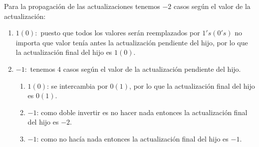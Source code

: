 \documentclass[letterpaper]{article}
\theoremstyle{definition}
\theoremstyle{lemathm}
\theoremstyle{lemathm}
\theoremstyle{lemathm}
\theoremstyle{lemademthm}
\newcommand{\1}{\mathbbm{1}}
\begin{document}
	Para la propagación de las actualizaciones tenemos $-2$ casos según el valor de la actualización:

	\begin{enumerate}
		\item $1(0):$ puesto que todos los valores serán reemplazados por $1's(0's)$ no importa que valor tenía antes la actualización pendiente del hijo, por lo que la actualización final del hijo es $1(0)$.
		\item $-1:$ tenemos $4$ casos según el valor de la actualización pendiente del hijo.
		\begin{enumerate}
			\item $1(0)$: se intercambia por $0(1)$, por lo que la actualización final del hijo es $0(1)$.
			\item $-1$: como doble invertir es no hacer nada entonces la actualización final del hijo es $-2$.
			\item $-1$: como no hacía nada entonces la actualización final del hijo es $-1$.
		\end{enumerate}
	\end{enumerate}
\end{document}
